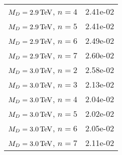 \begin{table}[hbtp]
\begin{center}
{\begin{tabular}{lr}
$M_{D} = 2.9 \,\text{Te\hspace{-.08em}V}$, $n=4$  & 2.41e-02 \\
$M_{D} = 2.9 \,\text{Te\hspace{-.08em}V}$, $n=5$  & 2.41e-02 \\
$M_{D} = 2.9 \,\text{Te\hspace{-.08em}V}$, $n=6$  & 2.49e-02 \\
$M_{D} = 2.9 \,\text{Te\hspace{-.08em}V}$, $n=7$  & 2.60e-02 \\
$M_{D} = 3.0 \,\text{Te\hspace{-.08em}V}$, $n=2$  & 2.58e-02 \\
$M_{D} = 3.0 \,\text{Te\hspace{-.08em}V}$, $n=3$  & 2.13e-02 \\
$M_{D} = 3.0 \,\text{Te\hspace{-.08em}V}$, $n=4$  & 2.04e-02 \\
$M_{D} = 3.0 \,\text{Te\hspace{-.08em}V}$, $n=5$  & 2.02e-02 \\
$M_{D} = 3.0 \,\text{Te\hspace{-.08em}V}$, $n=6$  & 2.05e-02 \\
$M_{D} = 3.0 \,\text{Te\hspace{-.08em}V}$, $n=7$  & 2.11e-02 \\\hline
  \end{tabular}

}
  \end{center}
\end{table}
